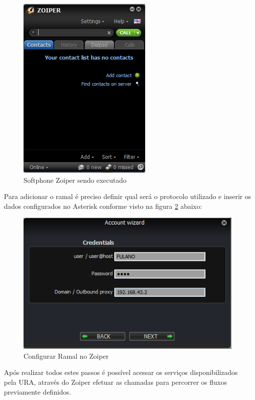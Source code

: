 \begin{figure}[H]
	\centering
	\caption{Softphone Zoiper sendo executado}	
	\label{figura:zoiper}
	\includegraphics{figuras/zoiper.png}
\end{figure}


Para adicionar o ramal é preciso definir qual será o protocolo utilizado e inserir os dados configurados no Asterisk conforme visto na figura \ref{figura:zoiperConfigRamal} abaixo:

\begin{figure}[H]
	\centering
	\caption{Configurar Ramal no Zoiper}
	\label{figura:zoiperConfigRamal}
	\includegraphics{figuras/configurar_ramal_zoiper.png}
\end{figure}

Após realizar todos estes passos é possível acessar os serviços disponibilizados pela URA, através do Zoiper efetuar as chamadas para percorrer os fluxos previamente definidos.